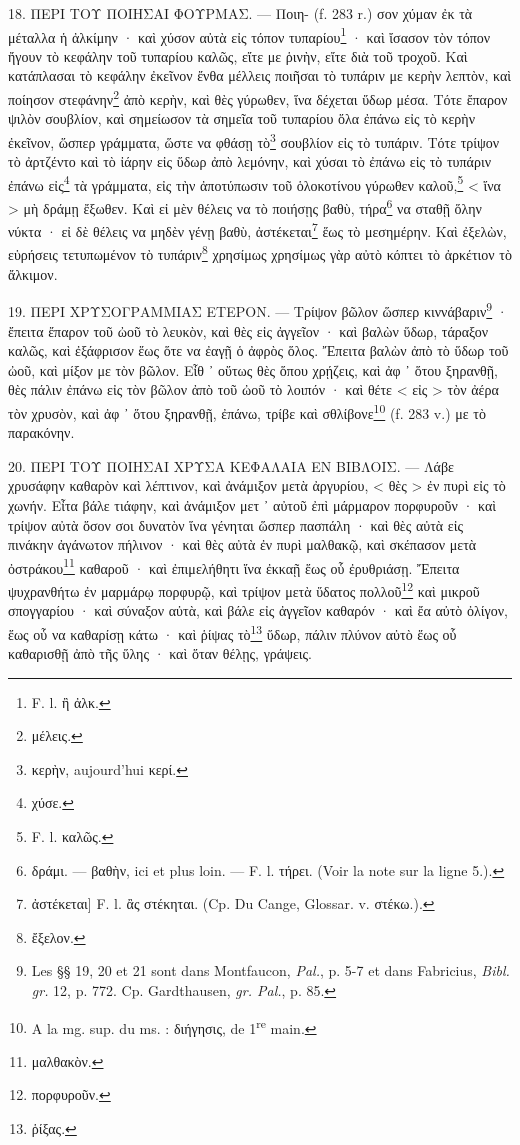 \documentclass[a4paper, 11pt, oneside, polutonikogreek, french]{article}
\begin{document}
18. ΠΕΡΙ ΤΟΥ ΠΟΙΗΣΑΙ ΦΟΥΡΜΑΣ. --- Ποιη- (f. 283 r.) σον χύμαν ἐκ τὰ μέταλλα ἡ ἀλκίμην · καὶ χύσον αὐτὰ εἰς τόπον τυπαρίου\footnote{F. l. ἢ ἀλκ.} · καὶ ἴσασον τὸν τόπον ἤγουν τὸ κεφάλην τοῦ τυπαρίου καλῶς, εἴτε με ῥινὴν, εἴτε διὰ τοῦ τροχοῦ. Καὶ κατάπλασαι τὸ κεφάλην ἐκεῖνον ἔνθα μέλλεις ποιῆσαι τὸ τυπάριν με κερὴν λεπτὸν, καὶ ποίησον στεφάνην\footnote{μέλεις.} ἀπὸ κερὴν, καὶ θὲς γύρωθεν, ἵνα δέχεται ὕδωρ μέσα. Τότε ἔπαρον ψιλὸν σουβλίον, καὶ σημείωσον τὰ σημεῖα τοῦ τυπαρίου ὅλα ἐπάνω εἰς τὸ κερὴν ἐκεῖνον, ὥσπερ γράμματα, ὥστε να φθάσῃ τὸ\footnote{κερὴν, aujourd'hui κερί.} σουβλίον εἰς τὸ τυπάριν. Τότε τρίψον τὸ ἀρτζέντο καὶ τὸ ἰάρην εἰς ὕδωρ ἀπὸ λεμόνην, καὶ χύσαι τὸ ἐπάνω εἰς τὸ τυπάριν ἐπάνω εἰς\footnote{χύσε.} τὰ γράμματα, εἰς τὴν ἀποτύπωσιν τοῦ ὁλοκοτίνου γύρωθεν καλοῦ,\footnote{F. l. καλῶς.} < ἵνα > μὴ δράμῃ ἔξωθεν. Καὶ εἰ μὲν θέλεις να τὸ ποιήσῃς βαθὺ, τήρα\footnote{δράμι. --- βαθὴν, ici et plus loin. --- F. l. τήρει. (Voir la note sur la ligne 5.).} να σταθῇ ὅλην νύκτα · εἰ δὲ θέλεις να μηδὲν γένῃ βαθὺ, ἀστέκεται\footnote{ἀστέκεται] F. l. ἂς στέκηται. (Cp. Du Cange, Glossar. v. στέκω.).} ἕως τὸ μεσημέρην. Καὶ ἐξελὼν, εὑρήσεις τετυπωμένον τὸ τυπάριν\footnote{ἔξελον.} χρησίμως χρησίμως γὰρ αὐτὸ κόπτει τὸ ἀρκέτιον τὸ ἄλκιμον.

19. ΠΕΡΙ ΧΡΥΣΟΓΡΑΜΜΙΑΣ ΕΤΕΡΟΝ. --- Τρίψον βῶλον ὥσπερ κιννάβαριν\footnote{Les §§ 19, 20 et 21 sont dans Montfaucon, \emph{Pal.}, p. 5-7 et dans Fabricius, \emph{Bibl. gr.} 12, p. 772. Cp. Gardthausen, \emph{gr. Pal.}, p. 85.} · ἔπειτα ἔπαρον τοῦ ὠοῦ τὸ λευκὸν, καὶ θὲς εἰς ἀγγεῖον · καὶ βαλὼν ὕδωρ, τάραξον καλῶς, καὶ ἐξάφρισον ἕως ὅτε να ἐαγῇ ὁ ἀφρὸς ὅλος. Ἔπειτα βαλὼν ἀπὸ τὸ ὕδωρ τοῦ ὠοῦ, καὶ μίξον με τὸν βῶλον. Εἶθ ᾽ οὕτως θὲς ὅπου χρῄζεις, καὶ ἀφ ᾽ ὅτου ξηρανθῇ, θὲς πάλιν ἐπάνω εἰς τὸν βῶλον ἀπὸ τοῦ ὠοῦ τὸ λοιπόν · καὶ θέτε < εἰς > τὸν ἀέρα τὸν χρυσὸν, καὶ ἀφ ᾽ ὅτου ξηρανθῇ, ἐπάνω, τρίβε καὶ σθλίβονε\footnote{A la mg. sup. du ms. : διήγησις, de 1\textsuperscript{re} main.} (f. 283 v.) με τὸ παρακόνην.

20. ΠΕΡΙ ΤΟΥ ΠΟΙΗΣΑΙ ΧΡΥΣΑ ΚΕΦΑΛΑΙΑ ΕΝ ΒΙΒΛΟΙΣ. --- Λάβε χρυσάφην καθαρὸν καὶ λέπτινον, καὶ ἀνάμιξον μετὰ ἀργυρίου, < θὲς > ἐν πυρὶ εἰς τὸ χωνήν. Εἶτα βάλε τιάφην, καὶ ἀνάμιξον μετ ᾽ αὐτοῦ ἐπὶ μάρμαρον πορφυροῦν · καὶ τρίψον αὐτὰ ὅσον σοι δυνατὸν ἵνα γένηται ὥσπερ πασπάλη · καὶ θὲς αὐτὰ εἰς πινάκην ἀγάνωτον πήλινον · καὶ θὲς αὐτὰ ἐν πυρὶ μαλθακῷ, καὶ σκέπασον μετὰ ὀστράκου\footnote{μαλθακὸν.} καθαροῦ · καὶ ἐπιμελήθητι ἵνα ἐκκαῇ ἕως οὗ ἐρυθριάσῃ. Ἔπειτα ψυχρανθήτω ἐν μαρμάρῳ πορφυρῷ, καὶ τρίψον μετὰ ὕδατος πολλοῦ\footnote{πορφυροῦν.} καὶ μικροῦ σπογγαρίου · καὶ σύναξον αὐτὰ, καὶ βάλε εἰς ἀγγεῖον καθαρόν · καὶ ἔα αὐτὸ ὀλίγον, ἕως οὗ να καθαρίσῃ κάτω · καὶ ῥίψας τὸ\footnote{ῥίξας.} ὕδωρ, πάλιν πλύνον αὐτὸ ἕως οὗ καθαρισθῇ ἀπὸ τῆς ὕλης · καὶ ὅταν θέλῃς, γράψεις.
\end{document}
